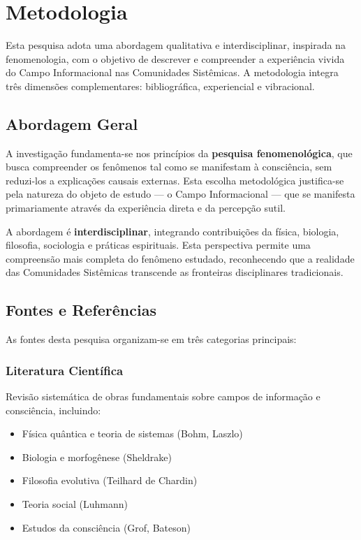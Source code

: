 \section{Metodologia}

Esta pesquisa adota uma abordagem qualitativa e interdisciplinar, inspirada na fenomenologia, com o objetivo de descrever e compreender a experiência vivida do Campo Informacional nas Comunidades Sistêmicas. A metodologia integra três dimensões complementares: bibliográfica, experiencial e vibracional.

\subsection{Abordagem Geral}

A investigação fundamenta-se nos princípios da \textbf{pesquisa fenomenológica}, que busca compreender os fenômenos tal como se manifestam à consciência, sem reduzi-los a explicações causais externas. Esta escolha metodológica justifica-se pela natureza do objeto de estudo — o Campo Informacional — que se manifesta primariamente através da experiência direta e da percepção sutil.

A abordagem é \textbf{interdisciplinar}, integrando contribuições da física, biologia, filosofia, sociologia e práticas espirituais. Esta perspectiva permite uma compreensão mais completa do fenômeno estudado, reconhecendo que a realidade das Comunidades Sistêmicas transcende as fronteiras disciplinares tradicionais.

\subsection{Fontes e Referências}

As fontes desta pesquisa organizam-se em três categorias principais:

\subsubsection{Literatura Científica}
Revisão sistemática de obras fundamentais sobre campos de informação e consciência, incluindo:
\begin{itemize}
    \item Física quântica e teoria de sistemas (Bohm, Laszlo)
    \item Biologia e morfogênese (Sheldrake)
    \item Filosofia evolutiva (Teilhard de Chardin)
    \item Teoria social (Luhmann)
    \item Estudos da consciência (Grof, Bateson)
\end{itemize}

